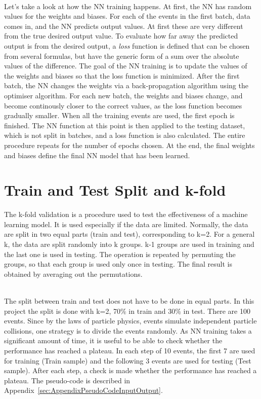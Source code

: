 \ \\Let's take a look at how the NN training happens. At first, the NN has random values for the weights and biases. For each of the events in the first batch, data comes in, and the NN predicts output values. At first these are very different from the true desired output value. To evaluate how far away the predicted output is from the desired output, a \emph{loss} function is defined that can be chosen from several formulas, but have the generic form of a sum over the absolute values of the difference. The goal of the NN training is to update the values of the weights and biases so that the loss function is minimized. After the first batch, the NN changes the weights via a back-propagation algorithm using the optimiser algorithm. For each new batch, the weights and biases change, and become continously closer to the correct values, as the loss function becomes gradually smaller. When all the training events are used, the first epoch is finished. The NN function at this point is then applied to the testing dataset, which is not split in batches, and a loss function is also calculated. The entire procedure repeats for the number of epochs chosen. At the end, the final weights and biases define the final NN model that has been learned.

\section{Train and Test Split and k-fold}
\label{sec:TrainAndTest}

The k-fold validation is a procedure used to test the effectiveness of a machine learning model. It is used especially if the data are limited. Normally, the data are split in two equal parts (train and test), corresponding to k=2. For a general k, the data are split randomly into k groups. k-1 groups are used in training and the last one is used in testing. The operation is repeated by permuting the groups, so that each group is used only once in testing. The final result is obtained by averaging out the permutations.

\ \\The split between train and test does not have to be done in equal parts. In this project the split is done with k=2, 70\% in train and 30\% in test. There are 100 events. Since by the laws of particle physics, events simulate independent particle collisions, one strategy is to divide the events randomly. As NN training takes a significant amount of time, it is useful to be able to check whether the performance has reached a plateau. In each step of 10 events, the first 7 are used for training (Train sample) and the following 3 events are used for testing (Test sample). After each step, a check is made whether the performance has reached a plateau. The pseudo-code is described in Appendix~\ref{sec:AppendixPseudoCodeInputOutput}.

